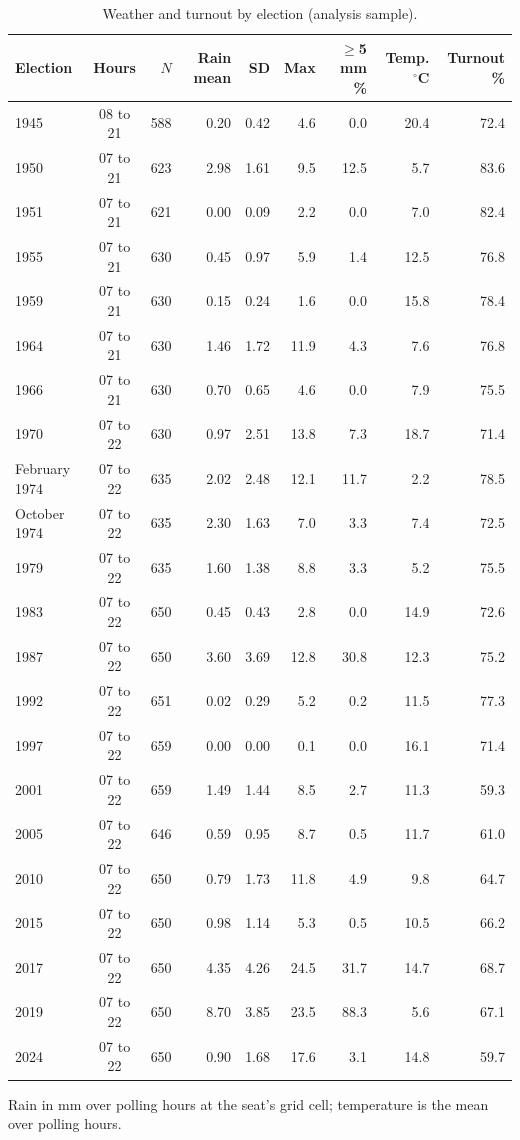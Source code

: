 \documentclass[11pt,a4paper]{article}
\begin{document}
\begin{table}[tbp]\centering\small\caption{Weather and turnout by election (analysis sample).}\label{tab:elec}
\begin{tabular}{lcrrrrrrr}\toprule Election & Hours & $N$ & Rain mean & SD & Max & $\geq$5 mm \% & Temp. $^\circ$C & Turnout \%\\\midrule
1945 & 08 to 21 & 588 & 0.20 & 0.42 & 4.6 & 0.0 & 20.4 & 72.4\\
1950 & 07 to 21 & 623 & 2.98 & 1.61 & 9.5 & 12.5 & 5.7 & 83.6\\
1951 & 07 to 21 & 621 & 0.00 & 0.09 & 2.2 & 0.0 & 7.0 & 82.4\\
1955 & 07 to 21 & 630 & 0.45 & 0.97 & 5.9 & 1.4 & 12.5 & 76.8\\
1959 & 07 to 21 & 630 & 0.15 & 0.24 & 1.6 & 0.0 & 15.8 & 78.4\\
1964 & 07 to 21 & 630 & 1.46 & 1.72 & 11.9 & 4.3 & 7.6 & 76.8\\
1966 & 07 to 21 & 630 & 0.70 & 0.65 & 4.6 & 0.0 & 7.9 & 75.5\\
1970 & 07 to 22 & 630 & 0.97 & 2.51 & 13.8 & 7.3 & 18.7 & 71.4\\
February 1974 & 07 to 22 & 635 & 2.02 & 2.48 & 12.1 & 11.7 & 2.2 & 78.5\\
October 1974 & 07 to 22 & 635 & 2.30 & 1.63 & 7.0 & 3.3 & 7.4 & 72.5\\
1979 & 07 to 22 & 635 & 1.60 & 1.38 & 8.8 & 3.3 & 5.2 & 75.5\\
1983 & 07 to 22 & 650 & 0.45 & 0.43 & 2.8 & 0.0 & 14.9 & 72.6\\
1987 & 07 to 22 & 650 & 3.60 & 3.69 & 12.8 & 30.8 & 12.3 & 75.2\\
1992 & 07 to 22 & 651 & 0.02 & 0.29 & 5.2 & 0.2 & 11.5 & 77.3\\
1997 & 07 to 22 & 659 & 0.00 & 0.00 & 0.1 & 0.0 & 16.1 & 71.4\\
2001 & 07 to 22 & 659 & 1.49 & 1.44 & 8.5 & 2.7 & 11.3 & 59.3\\
2005 & 07 to 22 & 646 & 0.59 & 0.95 & 8.7 & 0.5 & 11.7 & 61.0\\
2010 & 07 to 22 & 650 & 0.79 & 1.73 & 11.8 & 4.9 & 9.8 & 64.7\\
2015 & 07 to 22 & 650 & 0.98 & 1.14 & 5.3 & 0.5 & 10.5 & 66.2\\
2017 & 07 to 22 & 650 & 4.35 & 4.26 & 24.5 & 31.7 & 14.7 & 68.7\\
2019 & 07 to 22 & 650 & 8.70 & 3.85 & 23.5 & 88.3 & 5.6 & 67.1\\
2024 & 07 to 22 & 650 & 0.90 & 1.68 & 17.6 & 3.1 & 14.8 & 59.7\\
\bottomrule\end{tabular}\par\vspace{2pt}\parbox{\linewidth}{\footnotesize Rain in mm over polling hours at the seat's grid cell; temperature is the mean over polling hours.}\end{table}
\end{document}
